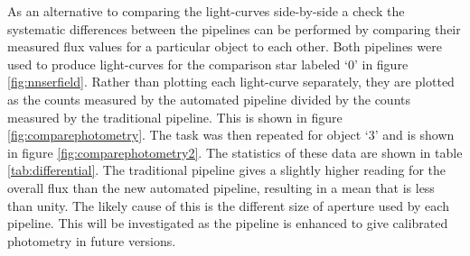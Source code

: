 

As an alternative to comparing the light-curves side-by-side a check the systematic differences between the pipelines can be performed by comparing their measured flux values for a particular object to each other. Both pipelines were used to produce light-curves for the comparison star labeled `0' in figure \ref{fig:nnserfield}. Rather than plotting each light-curve separately, they are plotted as the counts measured by the automated pipeline divided by the counts measured by the traditional pipeline. This is shown in figure \ref{fig:comparephotometry}. The task was then repeated for object `3' and is shown in figure \ref{fig:comparephotometry2}. The statistics of these data are shown in table \ref{tab:differential}. The traditional pipeline gives a slightly higher reading for the overall flux than the new automated pipeline, resulting in a mean that is less than unity. The likely cause of this is the different size of aperture used by each pipeline. This will be investigated as the pipeline is enhanced to give calibrated photometry in future versions. 

